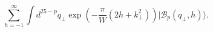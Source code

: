 \begin{equation}
  \sum_{h=-1}^{\infty} \int d^{25-p}q_{\bot}
  \exp\left(-\frac{\pi}{W}(2h + k^2_{\bot})\right)
  |\mathcal{B}_p(q_{\bot},h)\rangle.
\end{equation}


